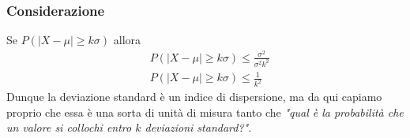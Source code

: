 \documentclass[11pt]{report}
\begin{document}
\subsubsection{Considerazione}
Se $P(\mid X - \mu \mid \geq k\sigma)$ allora
\begin{equation}
    \begin{split}
        & P(\mid X - \mu \mid \geq k\sigma) \leq \frac{\sigma^2}{\sigma^2 k^2}\\
        & P(\mid X - \mu \mid \geq k\sigma) \leq \frac{1}{k^2}
    \end{split}
\end{equation}
Dunque la deviazione standard è un indice di dispersione, ma da qui capiamo proprio che essa è una sorta di unità di misura tanto che \textit{"qual è la probabilità che un valore si collochi entro $k$ deviazioni standard?"}.
\end{document}
